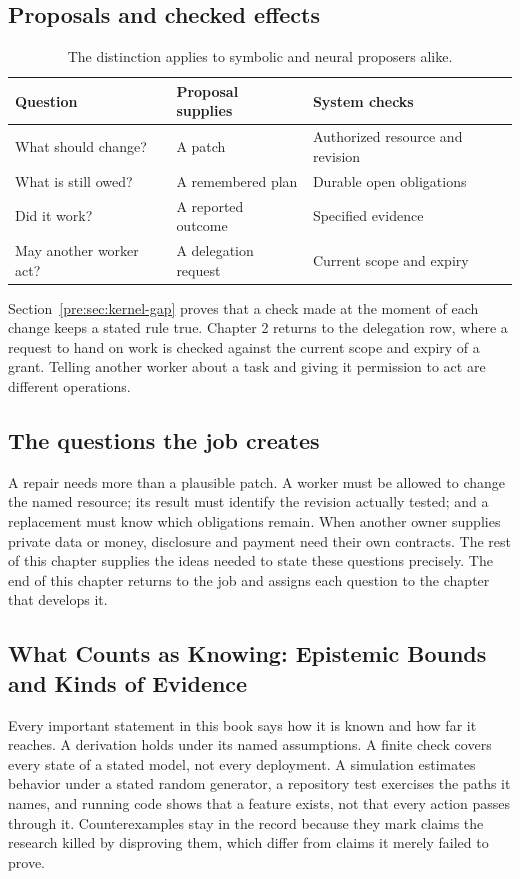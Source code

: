 \subsection{Proposals and checked effects}
\begin{table}[H]
\centering\small
\begin{tabularx}{\textwidth}{@{}lXX@{}}
\toprule
\textbf{Question} & \textbf{Proposal supplies} & \textbf{System checks}\\
\midrule
What should change? & A patch & Authorized resource and revision\\
What is still owed? & A remembered plan & Durable open obligations\\
Did it work? & A reported outcome & Specified evidence\\
May another worker act? & A delegation request & Current scope and expiry\\
\bottomrule
\end{tabularx}
\caption{The distinction applies to symbolic and neural proposers alike.}
\label{tab:lineage-comparison}
\end{table}
Section~\ref{pre:sec:kernel-gap} proves that a check made at the moment of
each change keeps a stated rule true. Chapter 2 returns to the delegation row,
where a request to hand on work is checked against the current scope and
expiry of a grant. Telling another worker about a task and giving it
permission to act are different operations.

\subsection{The questions the job creates}
A repair needs more than a plausible patch. A worker must be allowed to change
the named resource; its result must identify the revision actually tested;
and a replacement must know which obligations remain. When another owner
supplies private data or money, disclosure and payment need their own
contracts. The rest of this chapter supplies the ideas needed to state these
questions precisely. The end of this chapter returns to the job and assigns each question to the
chapter that develops it.

\subsection{What Counts as Knowing: Epistemic Bounds and Kinds of Evidence}
%
Every important statement in this book says how it is known and how far it
reaches. A derivation holds under its named assumptions. A finite check covers
every state of a stated model, not every deployment. A simulation estimates
behavior under a stated random generator, a repository test exercises the
paths it names, and running code shows that a feature exists, not that every
action passes through it. Counterexamples stay in the record because they mark
claims the research killed by disproving them, which differ from claims it
merely failed to prove.

